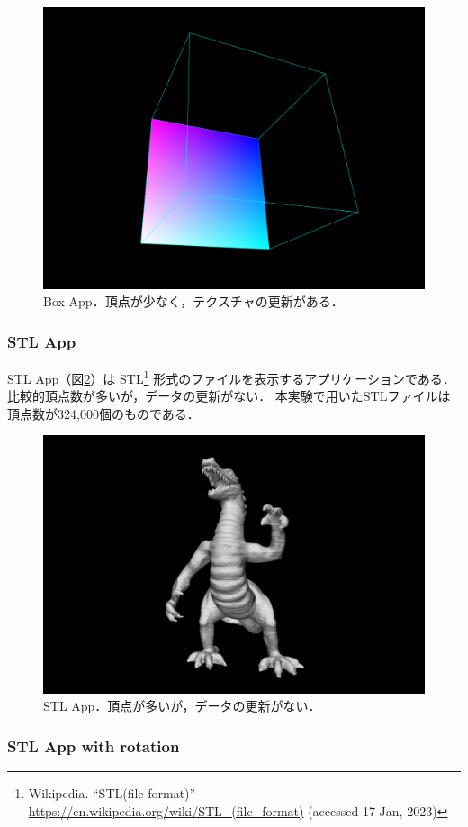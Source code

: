 \begin{figure}[htbp]
  \centering
  \includegraphics[keepaspectratio, width=0.6\linewidth]{figures/box-app.png}
  \caption{
    Box App．頂点が少なく，テクスチャの更新がある．
  }
  \label{fig:box-app}
\end{figure}

\subsubsection*{STL App}

STL App（図\ref{fig:stl-app}）は
STL\footnote{Wikipedia. ``STL(file format)'' \url{https://en.wikipedia.org/wiki/STL_(file_format)} (accessed 17 Jan, 2023)}
形式のファイルを表示するアプリケーションである．
比較的頂点数が多いが，データの更新がない．
本実験で用いたSTLファイルは頂点数が324,000個のものである．

\begin{figure}[htbp]
  \centering
  \includegraphics[keepaspectratio, width=0.6\linewidth]{figures/dragon-app.png}
  \caption{
    STL App．頂点が多いが，データの更新がない．
  }
  \label{fig:stl-app}
\end{figure}

\subsubsection*{STL App with rotation}

